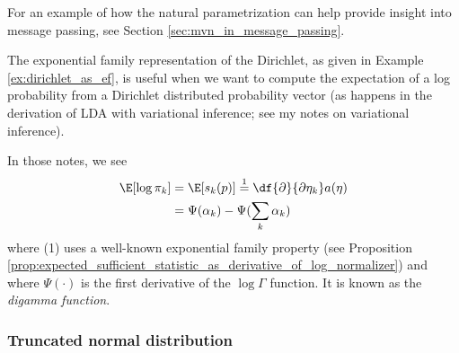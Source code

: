 \documentclass{article} %
\newcommand{\sufficientStatsFunction}{s}
\newcommand{\naturalParam}{\eta}
\begin{document}
For an example of how the natural parametrization can help provide insight into message passing,  see Section \ref{sec:mvn_in_message_passing}.

\begin{remark} The exponential family representation of the Dirichlet, as given in Example \ref{ex:dirichlet_as_ef}, is useful when we want to compute the expectation of a log probability from a Dirichlet distributed probability vector (as happens in the derivation of LDA with variational inference; see my notes on variational inference).  

In those notes,  we see
\begin{align} 
\E [ \log \pi_k] &= \E [\sufficientStatsFunction_k(p)] \stackrel{1}{=} \df{\partial}{\partial \naturalParam_k} a(\naturalParam) \nonumber \\
&=\Psi(\alpha_k) -  \Psi(\sum_k  \alpha_k) \label{eqn:expectation_of_log_probability} 
\end{align}
where (1) uses a well-known exponential family property (see Proposition \ref{prop:expected_sufficient_statistic_as_derivative_of_log_normalizer}) and where $\Psi(\cdot)$ is the first derivative of the $\log \Gamma$ function.   It is known as the \textit{digamma function}.  $ $

\end{remark}

\subsubsection{Truncated normal distribution}
\end{document}
